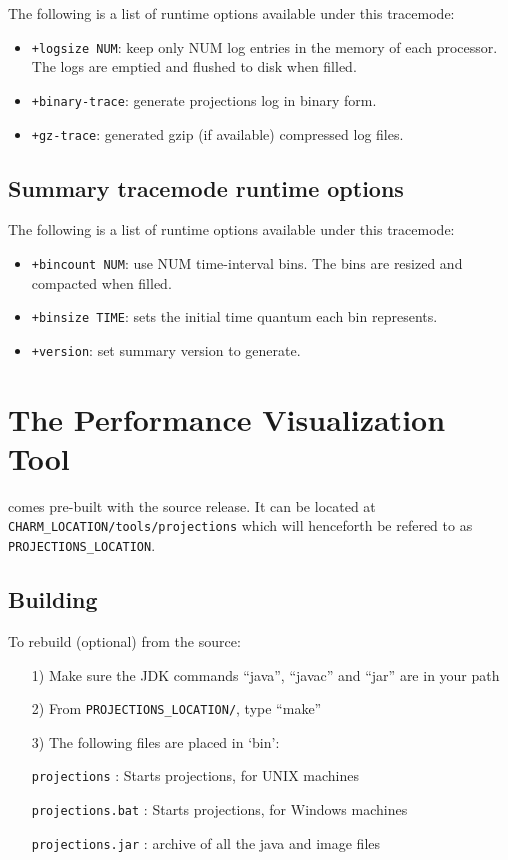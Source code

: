 \documentclass[10pt,dvips]{article}
\begin{document}
The following is a list of runtime options available under this tracemode:

\begin{itemize}
\item
{\tt +logsize NUM}:   keep only NUM log entries in the memory of each processor. The logs are emptied and flushed to disk when filled.
\item
{\tt +binary-trace}:  generate projections log in binary form.
\item
{\tt +gz-trace}:      generated gzip (if available) compressed log files.
\end{itemize}

\subsection{Summary tracemode runtime options}
\label{sec::summary runtime options}

The following is a list of runtime options available under this tracemode:

\begin{itemize}
\item
{\tt +bincount NUM}:   use NUM time-interval bins. The bins are resized and compacted when filled.
\item
{\tt +binsize TIME}:   sets the initial time quantum each bin represents.
\item
{\tt +version}:        set summary version to generate.
\end{itemize}

\section{The \projections{} Performance Visualization Tool}
\label{sec::visualization}

\projections{} comes pre-built with the \charmpp{} source release. It can
be located at \\
{\tt CHARM\_LOCATION/tools/projections} which will henceforth be refered 
to as {\tt PROJECTIONS\_LOCATION}.

\subsection{Building \projections{}}

To rebuild \projections{} (optional) from the source:

\begin{enumerate}
\item[1)]
   Make sure the JDK commands ``java'', ``javac'' and ``jar''
   are in your path
\item[2)]
   From {\tt PROJECTIONS\_LOCATION/}, type ``make''
\item[3)]
   The following files are placed in `bin':

      {\tt projections}           : Starts projections, for UNIX machines

      {\tt projections.bat}       : Starts projections, for Windows machines

      {\tt projections.jar}       : archive of all the java and image files
\end{enumerate}
\end{document}
